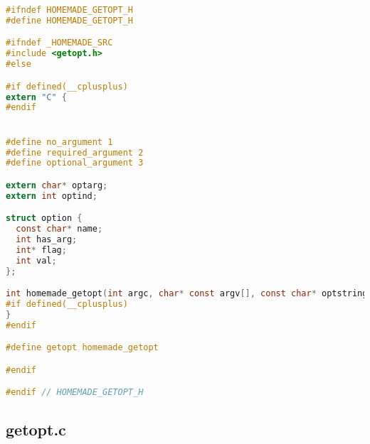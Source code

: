 \documentclass[blue,normal,cn]{elegantnote}
\begin{document}
\begin{lstlisting}[language=C]
#ifndef HOMEMADE_GETOPT_H
#define HOMEMADE_GETOPT_H

#ifndef _HOMEMADE_SRC
#include <getopt.h>
#else

#if defined(__cplusplus)
extern "C" {
#endif


#define no_argument 1
#define required_argument 2
#define optional_argument 3

extern char* optarg;
extern int optind;

struct option {
  const char* name;
  int has_arg;
  int* flag;
  int val;
};

int homemade_getopt(int argc, char* const argv[], const char* optstring);
#if defined(__cplusplus)
}
#endif

#define getopt homemade_getopt

#endif

#endif // HOMEMADE_GETOPT_H
\end{lstlisting}

\subsection{getopt.c}
\end{document}
